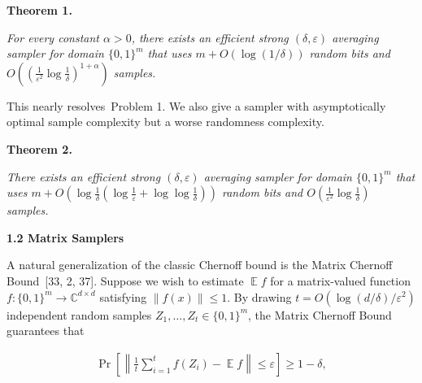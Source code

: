 \documentclass[10pt,a4paper]{article}
\begin{document}


\par\medskip\noindent\textbf{
\textbf{Theorem 1}\textbf{.}
}\par



\emph{For every constant $\alpha>0$, there exists an efficient strong $(\delta,\varepsilon)$ averaging sampler for domain $\{0,1\}^{m}$ that uses $m+O(\log(1/\delta))$ random bits and $O((\frac{1}{\varepsilon^{2}}\log\frac{1}{\delta})^{1+\alpha})$ samples.}\par






This nearly resolves Problem 1. We also give a sampler with asymptotically optimal sample complexity but a worse randomness complexity.\par





\par\medskip\noindent\textbf{
\textbf{Theorem 2}\textbf{.}
}\par



\emph{There exists an efficient strong $(\delta,\varepsilon)$ averaging sampler for domain $\{0,1\}^{m}$ that uses $m+O(\log\frac{1}{\delta}(\log\frac{1}{\varepsilon}+\log\log\frac{1}{\delta}))$ random bits and $O(\frac{1}{\varepsilon^{2}}\log\frac{1}{\delta})$ samples.}\par







\par\medskip\noindent\textbf{
1.2 Matrix Samplers}\par




A natural generalization of the classic Chernoff bound is the Matrix Chernoff Bound [33, 2, 37]. Suppose we wish to estimate $\operatorname*{\mathbb{E}}f$ for a matrix-valued function $f:\{0,1\}^{m}\to\mathbb{C}^{d\times d}$ satisfying $\left\lVert f(x)\right\rVert\leq 1$.
By drawing $t=O(\log(d/\delta)/\varepsilon^{2})$ independent random samples $Z_{1},\dots,Z_{t}\in\{0,1\}^{m}$, the
Matrix Chernoff Bound guarantees that\par


\[\begin{gathered}
\Pr\left[\left\lVert\frac{1}{t}\sum_{i=1}^{t}f(Z_{i})-\operatorname*{\mathbb{E}}f\right\rVert\leq\varepsilon\right]\geq 1-\delta,
\end{gathered}\]
\end{document}
